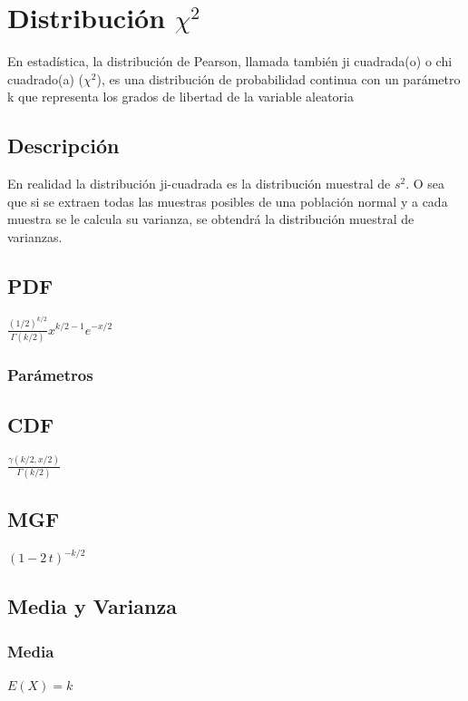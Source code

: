 \chapter{Distribución $ \chi^2 $}
En estadística, la distribución de Pearson, llamada también ji cuadrada(o) o chi cuadrado(a) ($ \chi^2 $), es una distribución de probabilidad continua con un parámetro  k que representa los grados de libertad de la variable aleatoria

\section{Descripción}
En realidad la distribución ji-cuadrada es la distribución muestral de $s^2$. O sea que si se extraen todas las muestras posibles de una población normal y a cada muestra se le calcula su varianza, se obtendrá la distribución muestral de varianzas. \cite{wiki:4}

\section{PDF}
\begin{center}
	$\frac {(1/2)^{k/2}}{\Gamma (k/2)} x^{k/2-1}e^{-x/2}$
\end{center}

\subsection{Parámetros}
		
\section{CDF}
\begin{center}
	$\frac {\gamma (k/2,x/2)}{\Gamma (k/2)}$
\end{center}

\section{MGF}
\begin{center}
	$(1-2\,t)^{-k/2}$
\end{center}

\section{Media y Varianza}
\subsection{Media}
\begin{center}
	$E(X) = k$
\end{center}


